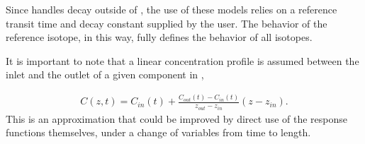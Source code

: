 Since \Cyclus handles decay outside of \Cyder, the use of these models relies on a
reference transit time and decay constant supplied by the user. The behavior of
the reference isotope, in this way, fully defines the behavior of all isotopes.

It is important to note that a linear concentration profile is assumed between
the inlet and the outlet of a given component in \Cyder,

\begin{align}
  C(z,t) = C_{in}(t)  + \frac{C_{out}(t) - C_{in}(t)}{z_{out} - z_{in}}(z-z_{in}).
\end{align}
This is an approximation that could be improved by direct use of the response
functions themselves, under a change of variables from time to length.


